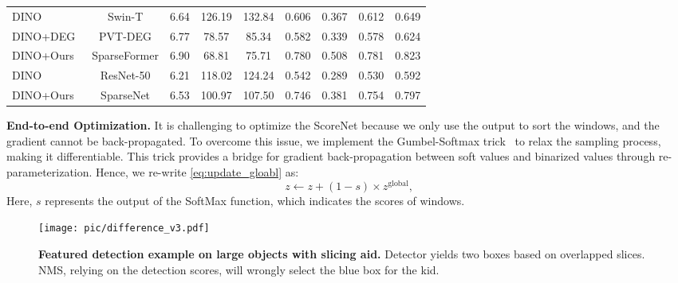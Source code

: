 \begin{table*}[]
{\begin{tabular}{l|c|ccc|cccc}
DINO~\cite{zhang2022dino}               & Swin-T         & 6.64     & 126.19  & 132.84   & 0.606        & 0.367    & 0.612    & 0.649    \\
DINO+DEG~\cite{song2021dynamic}         & PVT-DEG        & 6.77     & 78.57    & 85.34    & 0.582        & 0.339    & 0.578    & 0.624    \\
\rowcolor{LightBlue} 
DINO+Ours                               & SparseFormer   & 6.90     & 68.81    & 75.71    & 0.780        & 0.508    & 0.781    & 0.823    \\ \hline
DINO~\cite{zhang2022dino}               & ResNet-50      & 6.21     & 118.02   & 124.24   & 0.542        & 0.289    & 0.530    & 0.592    \\
DINO+Ours                               & SparseNet      & 6.53     & 100.97   & 107.50   & 0.746        & 0.381    & 0.754    & 0.797    \\ \hline
\end{tabular}
}
\label{tab:sota}
\end{table*}

\vspace{2mm}\noindent\textbf{End-to-end Optimization.}
It is challenging to optimize the ScoreNet because we only use the output to sort the windows, and the gradient cannot be back-propagated. To overcome this issue, we implement the Gumbel-Softmax trick~\cite{maddison2016concrete} to relax the sampling process, making it differentiable. This trick provides a bridge for gradient back-propagation between soft values and binarized values through re-parameterization.
Hence, we re-write \cref{eq:update_gloabl} as:
\begin{equation}
     z \gets  z + (1-s)\times z^{\text{global}}, 
\label{eq:re_write_update_gloabl}
\end{equation}
Here, $s$ represents the output of the SoftMax function, which indicates the scores of windows.


\begin{figure}[!]
\centering
		\texttt{[image: pic/difference\_v3.pdf]}
        \vspace{-12pt}
	\caption{\textbf{Featured detection example on large objects with slicing aid.} Detector yields two boxes based on overlapped slices. NMS, relying on the detection scores, will wrongly select the blue box for the kid.}
	\label{fig:challenge}	
\end{figure}

